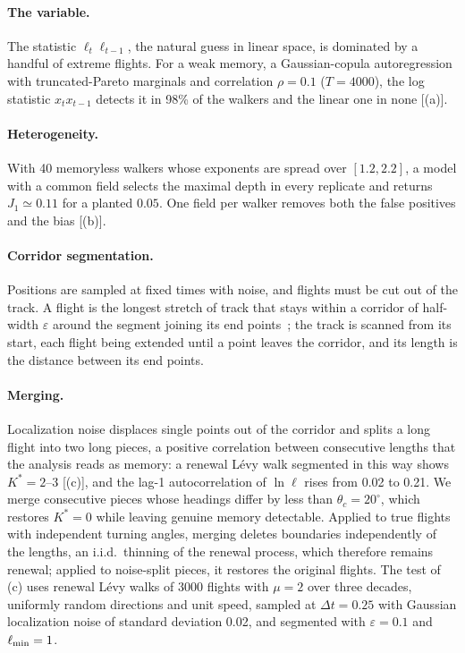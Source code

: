 \paragraph{The variable.} The statistic $\ell_t\ell_{t-1}$, the natural guess in linear space, is dominated by a handful of extreme flights. For a weak memory, a Gaussian-copula autoregression with truncated-Pareto marginals and correlation $\rho=0.1$ ($T=4000$), the log statistic $x_tx_{t-1}$ detects it in 98\% of the walkers and the linear one in none [(a)].

\paragraph{Heterogeneity.} With 40 memoryless walkers whose exponents are spread over $[1.2,2.2]$, a model with a common field selects the maximal depth in every replicate and returns $J_1\simeq0.11$ for a planted $0.05$. One field per walker removes both the false positives and the bias [(b)].

\paragraph{Corridor segmentation.} Positions are sampled at fixed times with noise, and flights must be cut out of the track. A flight is the longest stretch of track that stays within a corridor of half-width $\varepsilon$ around the segment joining its end points~\cite{Rhee2011,Humphries2013}; the track is scanned from its start, each flight being extended until a point leaves the corridor, and its length is the distance between its end points.

\paragraph{Merging.} Localization noise displaces single points out of the corridor and splits a long flight into two long pieces, a positive correlation between consecutive lengths that the analysis reads as memory: a renewal L\'evy walk segmented in this way shows $K^*=2$--3 [(c)], and the lag-1 autocorrelation of $\ln\ell$ rises from 0.02 to 0.21. We merge consecutive pieces whose headings differ by less than $\theta_c=20^\circ$, which restores $K^*=0$ while leaving genuine memory detectable. Applied to true flights with independent turning angles, merging deletes boundaries independently of the lengths, an i.i.d.\ thinning of the renewal process, which therefore remains renewal; applied to noise-split pieces, it restores the original flights. The test of (c) uses renewal L\'evy walks of 3000 flights with $\mu=2$ over three decades, uniformly random directions and unit speed, sampled at $\Delta t=0.25$ with Gaussian localization noise of standard deviation 0.02, and segmented with $\varepsilon=0.1$ and $\ell_{\min}=1$.

